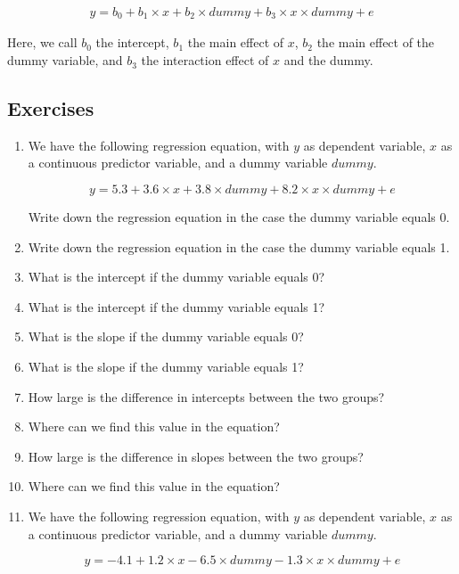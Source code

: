 \documentclass[]{report}\usepackage[]{graphicx}\usepackage[]{color}
\begin{document}
\begin{eqnarray} 
y =  b_0 + b_1  \times x + b_2  \times dummy +b_3 \times x \times dummy + e \nonumber
\end{eqnarray}

Here, we call $b_0$ the intercept, $b_1$ the main effect of $x$, $b_2$ the main effect of the dummy variable, and $b_3$ the interaction effect of $x$ and the dummy. 


\subsection{Exercises}

\begin{enumerate}
\item
We have the following regression equation, with $y$ as dependent variable, $x$ as a continuous predictor variable, and a dummy variable $dummy$.

\begin{equation} 
y = 5.3 + 3.6  \times x + 3.8  \times dummy + 8.2  \times x  \times dummy + e \nonumber
\end{equation}

Write down the regression equation in the case the dummy variable equals 0.
\item Write down the regression equation in the case the dummy variable equals 1.
\item What is the intercept if the dummy variable equals 0?
\item What is the intercept if the dummy variable equals 1?
\item What is the slope if the dummy variable equals 0?
\item What is the slope if the dummy variable equals 1?
\item How large is the difference in intercepts between the two groups?
\item Where can we find this value in the equation?
\item How large is the difference in slopes between the two groups?
\item Where can we find this value in the equation?


\item We have the following regression equation, with $y$ as dependent variable, $x$ as a continuous predictor variable, and a dummy variable $dummy$.

\begin{equation} 
y = - 4.1 + 1.2  \times x - 6.5  \times dummy - 1.3 \times x \times dummy + e \nonumber
\end{equation}


\end{enumerate}
\end{document}
